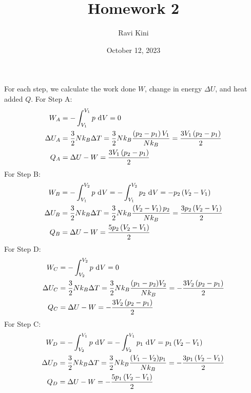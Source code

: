 \documentclass{article}
\title{Homework 2}
\author{Ravi Kini}
\date{October 12, 2023}
\begin{document}
\maketitle

For each step, we calculate the work done $W$, change in energy $\Delta U$, and heat added $Q$. For Step A:
\begin{equation}
    \begin{split}
        W_A & = -\int_{V_1}^{V_1} p \, \diff{V} = 0 \\
        \Delta U_A & = \frac{3}{2}Nk_B \Delta T = \frac{3}{2}Nk_B\frac{\left(p_2 - p_1\right)V_1}{Nk_B} = \frac{3V_1\left(p_2 - p_1\right)}{2} \\
        Q_A & = \Delta U - W = \frac{3V_1\left(p_2 - p_1\right)}{2}
    \end{split}
\end{equation}
For Step B:
\begin{equation}
    \begin{split}
        W_B & = -\int_{V_1}^{V_2} p \, \diff{V} = -\int_{V_1}^{V_2} p_2 \, \diff{V} = -p_2\left(V_2 - V_1\right) \\
        \Delta U_B & = \frac{3}{2}Nk_B \Delta T = \frac{3}{2}Nk_B\frac{\left(V_2 - V_1\right)p_2}{Nk_B} = \frac{3p_2\left(V_2 - V_1\right)}{2} \\
        Q_B & = \Delta U - W = \frac{5p_2\left(V_2 - V_1\right)}{2}
    \end{split}
\end{equation}
For Step D:
\begin{equation}
    \begin{split}
        W_C & = -\int_{V_2}^{V_2} p \, \diff{V} = 0 \\
        \Delta U_C & = \frac{3}{2}Nk_B \Delta T = \frac{3}{2}Nk_B\frac{(p_1 - p_2)V_2}{Nk_B} = -\frac{3V_2\left(p_2 - p_1\right)}{2} \\
        Q_C & = \Delta U - W = -\frac{3V_2\left(p_2 - p_1\right)}{2}
    \end{split}
\end{equation}
For Step C:
\begin{equation}
    \begin{split}
        W_D & = -\int_{V_2}^{V_1} p \, \diff{V} = -\int_{V_2}^{V_1} p_1 \, \diff{V} = p_1\left(V_2 - V_1\right) \\
        \Delta U_D & = \frac{3}{2}Nk_B \Delta T = \frac{3}{2}Nk_B\frac{(V_1 - V_2)p_1}{Nk_B} = -\frac{3p_1\left(V_2 - V_1\right)}{2} \\
        Q_D & = \Delta U - W = -\frac{5p_1\left(V_2 - V_1\right)}{2}
    \end{split}
\end{equation}
\end{document}

